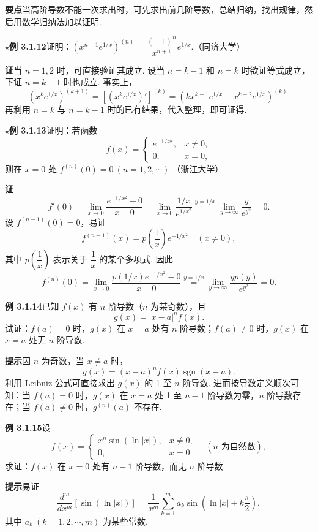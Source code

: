 \documentclass[UTF8, 12pt, fontset=fandol, oneside]{ctexart}
\begin{document}
\noindent\textbf{要点}\quad 当高阶导数不能一次求出时，可先求出前几阶导数，总结归纳，找出规律，然后用数学归纳法加以证明.

\noindent\textbf{$\star$例 3.1.12}\quad 证明：$\left(x^{n-1}e^{1/x}\right)^{(n)}=\dfrac{(-1)^n}{x^{n+1}}e^{1/x}$.（同济大学）

\noindent\textbf{证}\quad 当 $n=1,2$ 时，可直接验证其成立. 设当 $n=k-1$ 和 $n=k$ 时欲证等式成立，下证 $n=k+1$ 时也成立. 事实上，
\[
  \left(x^k e^{1/x}\right)^{(k+1)}
  =\left[(x^k e^{1/x})'\right]^{(k)}
  =\left(kx^{k-1}e^{1/x}-x^{k-2}e^{1/x}\right)^{(k)}.
\]
再利用 $n=k$ 与 $n=k-1$ 时的已有结果，代入整理，即可证得.

\noindent\textbf{$\star$例 3.1.13}\quad 证明：若函数
\[
f(x)=
\begin{cases}
e^{-1/x^2}, & x\ne0,\\
0, & x=0,
\end{cases}
\]
则在 $x=0$ 处 $f^{(n)}(0)=0\ (n=1,2,\cdots)$.（浙江大学）

\noindent\textbf{证}\quad
\[
  f'(0)=\lim_{x\to0}\frac{e^{-1/x^2}-0}{x-0}
  =\lim_{x\to0}\frac{1/x}{e^{1/x^2}}
  \stackrel{y=1/x}{=}\lim_{y\to\infty}\frac{y}{e^{y^2}}=0.
\]
设 $f^{(n-1)}(0)=0$，易证
\[
  f^{(n-1)}(x)=p\left(\frac1x\right)e^{-1/x^2}\quad(x\ne0),
\]
其中 $p\left(\dfrac1x\right)$ 表示关于 $\dfrac1x$ 的某个多项式. 因此
\[
  f^{(n)}(0)=\lim_{x\to0}\frac{p(1/x)e^{-1/x^2}-0}{x-0}
  \stackrel{y=1/x}{=}\lim_{y\to\infty}\frac{yp(y)}{e^{y^2}}=0.
\]

\noindent\textbf{例 3.1.14}\quad 已知 $f(x)$ 有 $n$ 阶导数（$n$ 为某奇数），且
\[
  g(x)=|x-a|^n f(x).
\]
试证：$f(a)=0$ 时，$g(x)$ 在 $x=a$ 处有 $n$ 阶导数；$f(a)\ne0$ 时，$g(x)$ 在 $x=a$ 处无 $n$ 阶导数.

\noindent\textbf{提示}\quad 因 $n$ 为奇数，当 $x\ne a$ 时，
\[
  g(x)=(x-a)^n f(x)\operatorname{sgn}(x-a).
\]
利用 Leibniz 公式可直接求出 $g(x)$ 的 1 至 $n$ 阶导数. 进而按导数定义顺次可知：当 $f(a)=0$ 时，$g(x)$ 在 $x=a$ 处 1 至 $n-1$ 阶导数为零，$n$ 阶导数存在；当 $f(a)\ne0$ 时，$g^{(n)}(a)$ 不存在.

\noindent\textbf{例 3.1.15}\quad 设
\[
f(x)=
\begin{cases}
x^n\sin(\ln|x|), & x\ne0,\\
0, & x=0
\end{cases}
\quad(n\text{ 为自然数}),
\]
求证：$f(x)$ 在 $x=0$ 处有 $n-1$ 阶导数，而无 $n$ 阶导数.

\noindent\textbf{提示}\quad 易证
\[
  \frac{d^m}{dx^m}[\sin(\ln|x|)]
  =\frac1{x^m}\sum_{k=1}^m a_k\sin\left(\ln|x|+k\frac\pi2\right),
\]
其中 $a_k\ (k=1,2,\cdots,m)$ 为某些常数.
\end{document}
